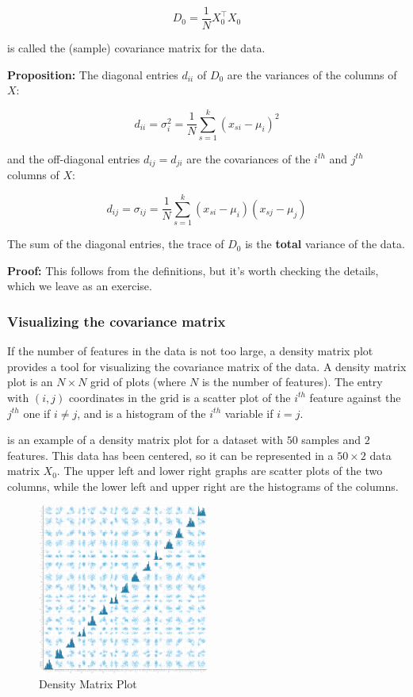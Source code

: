 \documentclass[
]{article}
\begin{document}
\[
D_{0} = \frac{1}{N}X_{0}^{\intercal}X_{0}
\]

is called the (sample) covariance matrix for the data.

\textbf{Proposition:} The diagonal entries \(d_{ii}\) of \(D_{0}\) are
the variances of the columns of \(X\):

\[
d_{ii} = \sigma_{i}^2 = \frac{1}{N}\sum_{s=1}^{k}(x_{si}-\mu_i)^2
\]

and the off-diagonal entries \(d_{ij} = d_{ji}\) are the covariances of
the \(i^{th}\) and \(j^{th}\) columns of \(X\):

\[
d_{ij} = \sigma_{ij} = \frac{1}{N}\sum_{s=1}^{k}(x_{si}-\mu_{i})(x_{sj}-\mu_{j})
\]

The sum of the diagonal entries, the trace of \(D_{0}\) is the
\textbf{total} variance of the data.

\textbf{Proof:} This follows from the definitions, but it's worth
checking the details, which we leave as an exercise.

\hypertarget{sec:visualizecovar}{%
\subsubsection{Visualizing the covariance
matrix}\label{sec:visualizecovar}}

If the number of features in the data is not too large, a density matrix
plot provides a tool for visualizing the covariance matrix of the data.
A density matrix plot is an \(N\times N\) grid of plots (where \(N\) is
the number of features). The entry with \((i,j)\) coordinates in the
grid is a scatter plot of the \(i^{th}\) feature against the \(j^{th}\)
one if \(i\not=j\), and is a histogram of the \(i^{th}\) variable if
\(i=j\).

 is an example of a density matrix plot for a dataset
with \(50\) samples and \(2\) features. This data has been centered, so
it can be represented in a \(50\times 2\) data matrix \(X_{0}\). The
upper left and lower right graphs are scatter plots of the two columns,
while the lower left and upper right are the histograms of the columns.

\begin{figure}
\hypertarget{fig:density0}{%
\centering
\includegraphics[width=0.5\textwidth,height=\textheight]{../img/density.png}
\caption{Density Matrix Plot}\label{fig:density0}
}
\end{figure}
\end{document}
